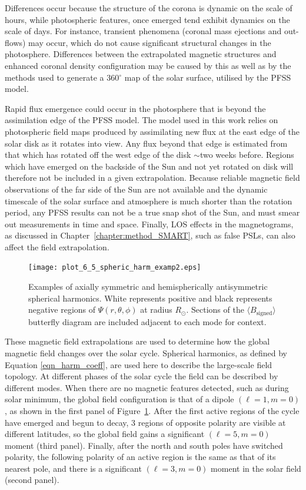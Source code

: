 Differences occur because the structure of the corona is dynamic on the scale of hours, while photospheric features, once emerged tend exhibit dynamics on the scale of days. For instance, transient phenomena (coronal mass ejections and out-flows) may occur, which do not cause significant structural changes in the photosphere. Differences between the extrapolated magnetic structures and enhanced coronal density configuration may be caused by this as well as by the methods used to generate a 360$^\circ$ map of the solar surface, utilised by the \gls{PFSS} model. 

Rapid flux emergence could occur in the photosphere that is beyond the assimilation edge of the \gls{PFSS} model. The model used in this work relies on photospheric field maps produced by assimilating new flux at the east edge of the solar disk as it rotates into view. Any flux beyond that edge is estimated from that which has rotated off the west edge of the disk $\sim$two weeks before. Regions which have emerged on the backside of the Sun and not yet rotated on disk will therefore not be included in a given extrapolation. Because reliable magnetic field observations of the far side of the Sun are not available and the dynamic timescale of the solar surface and atmosphere is much shorter than the rotation period, any \gls{PFSS} results can not be a true snap shot of the Sun, and must smear out measurements in time and space. Finally, \gls{LOS} effects in the magnetograms, as discussed in Chapter~\ref{chapter:method_SMART}, such as false \glspl{PSL}, can also affect the field extrapolation.

\begin{figure}[!t]
\centerline{\texttt{[image: plot\_6\_5\_spheric\_harm\_examp2.eps]}}
\caption[Spherical harmonic visualisations.]{Examples of axially symmetric and hemispherically antisymmetric spherical harmonics. White represents positive and black represents negative regions of $\Psi(r,\theta,\phi)$ at radius $R_{\odot}$. Sections of the $\langle B_{\mathrm{signed}} \rangle$ butterfly diagram are included adjacent to each mode for context.}
\label{plot_6_5_spheric_harm_examp}
\end{figure}

These magnetic field extrapolations are used to determine how the global magnetic field changes over the solar cycle. Spherical harmonics, as defined by Equation \ref{eqn_harm_coeff}, are used here to describe the large-scale field topology. At different phases of the solar cycle the field can be described by different modes. When there are no magnetic features detected, such as during solar minimum, the global field configuration is that of a dipole $(\ell=1,m=0)$, as shown in the first panel of Figure~\ref{plot_6_5_spheric_harm_examp}. After the first active regions of the cycle have emerged and begun to decay, 3 regions of opposite polarity are visible at different latitudes, so the global field gains a significant $(\ell=5,m=0)$ moment (third panel). Finally, after the north and south poles have switched polarity, the following polarity of an active region is the same as that of its nearest pole, and there is a significant $(\ell=3,m=0)$ moment in the solar field (second panel). 

